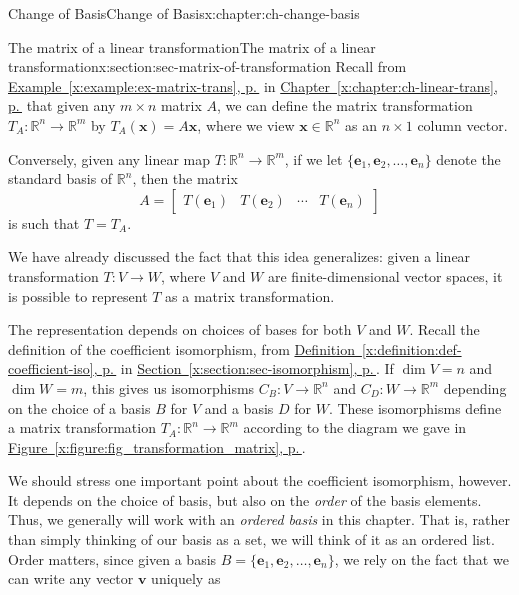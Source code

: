 \documentclass[oneside,10pt,]{book}
\newcommand{\xreffont}{\relax}
\numberwithin{equation}{section}
\newcommand{\bbm}{\begin{bmatrix}}
\newcommand{\ebm}{\end{bmatrix}}
\newcommand{\R}{\mathbb{R}}
\newcommand{\vv}{\mathbf{v}}
\newcommand{\xx}{\mathbf{x}}
\newcommand{\basis}[2]{\{\mathbf{#1}_1,\mathbf{#1}_2,\ldots,\mathbf{#1}_{#2}\}}
\newcommand{\amp}{&}
\begin{document}
\begin{chapterptx}{Change of Basis}{}{Change of Basis}{}{}{x:chapter:ch-change-basis}
%
%
\typeout{************************************************}
\typeout{************************************************}
%
\begin{sectionptx}{The matrix of a linear transformation}{}{The matrix of a linear transformation}{}{}{x:section:sec-matrix-of-transformation}
Recall from \hyperref[x:example:ex-matrix-trans]{Example~{\xreffont\ref{x:example:ex-matrix-trans}}, p.\,\pageref{x:example:ex-matrix-trans}} in \hyperref[x:chapter:ch-linear-trans]{Chapter~{\xreffont\ref{x:chapter:ch-linear-trans}}, p.\,\pageref{x:chapter:ch-linear-trans}} that given any \(m\times n\) matrix \(A\), we can define the matrix transformation \(T_A:\R^n\to \R^m\) by \(T_A(\xx)=A\xx\), where we view \(\xx\in\R^n\) as an \(n\times 1\) column vector.%
\par
Conversely, given any linear map \(T:\R^n\to \R^m\), if we let \(\basis{e}{n}\) denote the standard basis of \(\R^n\), then the matrix%
\begin{equation*}
A = \bbm T(\mathbf{e}_1) \amp T(\mathbf{e}_2) \amp \cdots \amp T(\mathbf{e}_n)\ebm
\end{equation*}
is such that \(T=T_A\).%
\par
We have already discussed the fact that this idea generalizes: given a linear transformation \(T:V\to W\), where \(V\) and \(W\) are finite-dimensional vector spaces, it is possible to represent \(T\) as a matrix transformation.%
\par
The representation depends on choices of bases for both \(V\) and \(W\). Recall the definition of the coefficient isomorphism, from \hyperref[x:definition:def-coefficient-iso]{Definition~{\xreffont\ref{x:definition:def-coefficient-iso}}, p.\,\pageref{x:definition:def-coefficient-iso}} in \hyperref[x:section:sec-isomorphism]{Section~{\xreffont\ref{x:section:sec-isomorphism}}, p.\,\pageref{x:section:sec-isomorphism}}. If \(\dim V=n\) and \(\dim W=m\), this gives us isomorphisms \(C_B:V\to \R^n\) and \(C_D:W\to \R^m\) depending on the choice of a basis \(B\) for \(V\) and a basis \(D\) for \(W\). These isomorphisms define a matrix transformation \(T_A:\R^n\to \R^m\) according to the diagram we gave in \hyperref[x:figure:fig_transformation_matrix]{Figure~{\xreffont\ref{x:figure:fig_transformation_matrix}}, p.\,\pageref{x:figure:fig_transformation_matrix}}.%
\par
We should stress one important point about the coefficient isomorphism, however. It depends on the choice of basis, but also on the \emph{order} of the basis elements. Thus, we generally will work with an \emph{ordered basis} in this chapter. That is, rather than simply thinking of our basis as a set, we will think of it as an ordered list. Order matters, since given a basis \(B=\basis{e}{n}\), we rely on the fact that we can write any vector \(\vv\) uniquely as%

\end{sectionptx}
\end{chapterptx}
\end{document}
